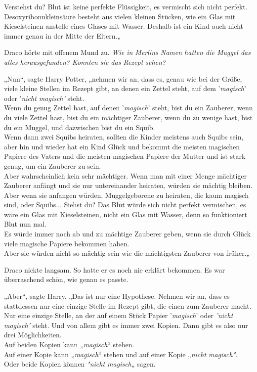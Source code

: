 {Verstehst du? Blut ist keine perfekte Flüssigkeit, es vermischt sich nicht perfekt. Desoxyribonukleinsäure besteht aus vielen kleinen Stücken, wie ein Glas mit Kieselsteinen anstelle eines Glases mit Wasser. Deshalb ist ein Kind auch nicht immer genau in der Mitte der Eltern.„

Draco hörte mit offenem Mund zu. \emph{Wie in Merlins Namen hatten die Muggel das alles herausgefunden? Konnten sie das Rezept sehen?}

„Nun“, sagte Harry Potter, „nehmen wir an, dass es, genau wie bei der Größe, viele kleine Stellen im Rezept gibt, an denen ein Zettel steht, auf dem '\emph{magisch}' oder '\emph{nicht magisch'} steht.\\ Wenn du genug Zettel hast, auf denen '\emph{magisch}' steht, bist du ein Zauberer, wenn du viele Zettel hast, bist du ein mächtiger Zauberer, wenn du zu wenige hast, bist du ein Muggel, und dazwischen bist du ein Squib.\\ Wenn dann zwei Squibs heiraten, sollten die Kinder meistens auch Squibs sein, aber hin und wieder hat ein Kind Glück und bekommt die meisten magischen Papiere des Vaters und die meisten magischen Papiere der Mutter und ist stark genug, um ein Zauberer zu sein.\\ Aber wahrscheinlich kein sehr mächtiger. Wenn man mit einer Menge mächtiger Zauberer anfängt und sie nur untereinander heiraten, würden sie mächtig bleiben.\\ Aber wenn sie anfangen würden, Muggelgeborene zu heiraten, die kaum magisch sind, oder Squibs... Siehst du? Das Blut würde sich nicht perfekt vermischen, es wäre ein Glas mit Kieselsteinen, nicht ein Glas mit Wasser, denn so funktioniert Blut nun mal.\\ Es würde immer noch ab und zu mächtige Zauberer geben, wenn sie durch Glück viele magische Papiere bekommen haben.\\ Aber sie würden nicht so mächtig sein wie die mächtigsten Zauberer von früher.„

Draco nickte langsam. So hatte er es noch nie erklärt bekommen. Es war überraschend schön, wie genau es passte.

„Aber“, sagte Harry. „Das ist nur eine Hypothese. Nehmen wir an, dass es stattdessen nur eine einzige Stelle im Rezept gibt, die einen zum Zauberer macht.\\ Nur eine einzige Stelle, an der auf einem Stück Papier '\emph{magisch}' oder \emph{'nicht magisch'} steht. Und von allem gibt es immer zwei Kopien. Dann gibt es also nur drei Möglichkeiten.\\ Auf beiden Kopien kann „\emph{magisch}“ stehen.\\ Auf einer Kopie kann „\emph{magisch}“ stehen und auf einer Kopie „\emph{nicht magisch"}.\\ Oder beide Kopien können \emph{"nicht magisch„} sagen.

}

